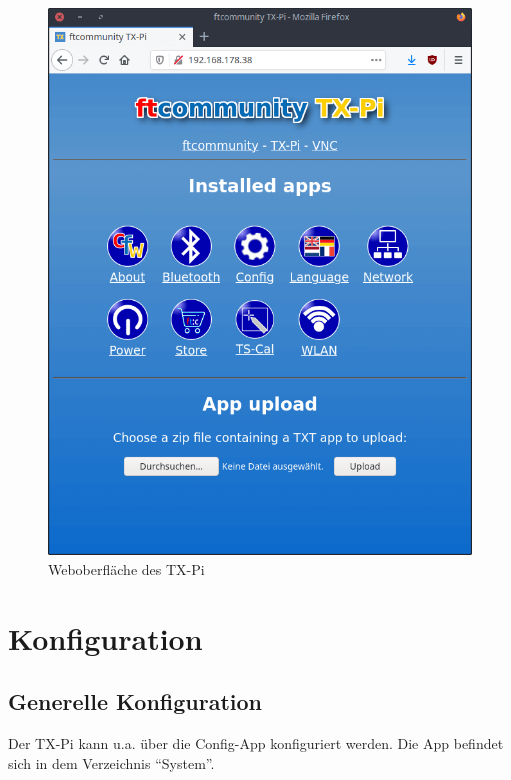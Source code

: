 \documentclass[
  paper=A4,
  ngerman,
  fontsize=12pt,
  parskip=half-,
]{scrbook}
\begin{document}
\begin{figure}[h]
\centering
\includegraphics[scale=0.35]{images/browser.png}
\caption{Weboberfläche des TX-Pi}
\end{figure}


\chapter{Konfiguration}
\label{chapter:config}

\section{Generelle Konfiguration}
\label{sec:config}

Der TX-Pi kann u.a. über die Config-App konfiguriert werden. Die App befindet sich
in dem Verzeichnis "`System"'.
\end{document}

